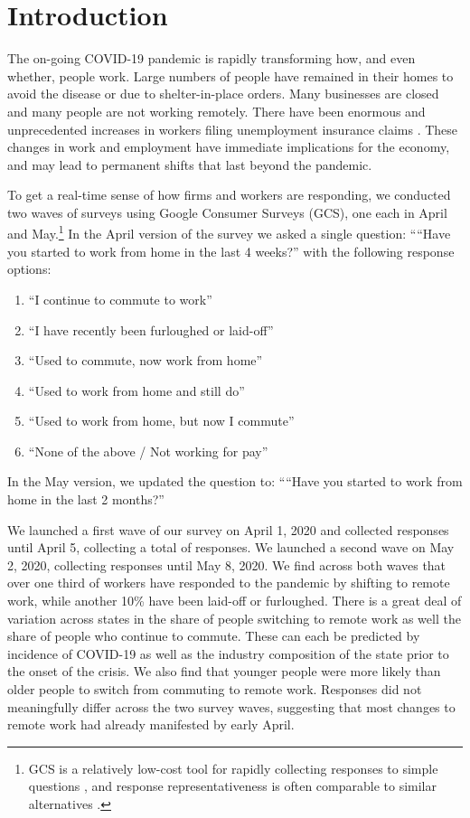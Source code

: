\documentclass[12pt]{article}
\newcommand{\covid}{COVID-19}
\begin{document}
\onehalfspacing 

\section{Introduction}
The on-going \covid{} pandemic is rapidly transforming how, and even whether, people work. Large numbers of people have remained in their homes to avoid the disease or due to shelter-in-place orders. Many businesses are closed and many people are not working remotely. There have been enormous and unprecedented increases in workers filing unemployment insurance claims \citep{goldsmith2020}. These changes in work and employment have immediate implications for the economy, and may lead to permanent shifts that last beyond the pandemic.

To get a real-time sense of how firms and workers are responding, we conducted two waves of surveys using Google Consumer Surveys (GCS), one each in April and May.\footnote{
GCS is a relatively low-cost tool for rapidly collecting responses to simple questions \cite{stephens2014hands}, and response representativeness is often comparable to similar alternatives \citep{santoso2016survey, brynjolfsson2019using}.}  In the April version of the survey we asked a single question:
````Have you started to work from home in the last 4 weeks?''
with the following response options: 
\begin{enumerate} 
\item ``I continue to commute to work''
\item ``I have recently been furloughed or laid-off''
\item ``Used to commute, now work from home''   
\item ``Used to work from home and still do''       
\item ``Used to work from home, but now I commute''
\item ``None of the above / Not working for pay''
\end{enumerate} 
In the May version, we updated the question to: ````Have you started to work from home in the last 2 months?''

We launched a first wave of our survey on April 1, 2020 and collected responses until April 5, collecting a total of \numObsold{} responses. We launched a second wave on May 2, 2020, collecting \numObs{} responses until May 8, 2020. We find across both waves that over one third of workers have responded to the pandemic by shifting to remote work, while another 10\% have been laid-off or furloughed.
There is a great deal of variation across states in the share of people switching to remote work as well the share of people who continue to commute. These can each be predicted by incidence of COVID-19 as well as the industry composition of the state prior to the onset of the crisis.  We also find that younger people were more likely than older people to switch from commuting to remote work. Responses did not meaningfully differ across the two survey waves, suggesting that most changes to remote work had already manifested by early April.  
\end{document}
